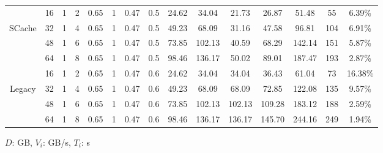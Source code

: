 {\begin{table}[!t]
\begin{minipage}{\columnwidth}
{\begin{tabular}{|c||c|c|c|c|c|c|c||c|c|c|c|c|c|c|}
	\hline
	& 16	& 1	& 2 &	0.65 &	1 &	0.47 &	0.5 &	24.62 &		34.04	 &	21.73 &	26.87 &	51.48	& 55  &		6.39\% \\
	SCache
	& 32	& 1	& 4 &	0.65 &	1 &	0.47 &	0.5 &	49.23 &		68.09	 &	31.16 &	47.58 &	96.81	& 104 & 	6.91\% \\
	& 48	& 1	& 6 &	0.65 &	1 &	0.47 &	0.5 &	73.85 &		102.13 &	40.59 &	68.29 &	142.14	& 151 & 	5.87\% \\
	& 64	& 1	& 8 &	0.65 &	1 &	0.47 &	0.5 &	98.46 &		136.17 &	50.02 &	89.01 &	187.47	& 193 & 	2.87\% \\
	\hline
	& 16	& 1 & 2 &	0.65 &	1 &	0.47 &	0.6 &	24.62 &		34.04	&	34.04	&	36.43	&	61.04	&	73	&	16.38\%	\\
	Legacy
	& 32	& 1 & 4 &	0.65 &	1 &	0.47 &	0.6 &	49.23 &		68.09	&	68.09	&	72.85	&	122.08	&	135	&	9.57\%	\\
	& 48	& 1 & 6 &	0.65 &	1 &	0.47 &	0.6 &	73.85 &		102.13	&	102.13	&	109.28	&	183.12	&	188	&	2.59\%	\\
	& 64	& 1 & 8 &	0.65 &	1 &	0.47 &	0.6 &	98.46 &		136.17	&	136.17	&	145.70	&	244.16	&	249	&	1.94\%	\\
	\hline
	\end{tabular}
}
\end{minipage}
\end{table}

\begin{table}[!t]
\caption{\color{blue}Hadoop MapReduce on 50 AWS m4.xlarge nodes cluster in the FRQ model}
\label{table2}
\centering
\(D\): GB, \(V_{i}\): GB/s, \(T_{i}\): s
\end{table}}
